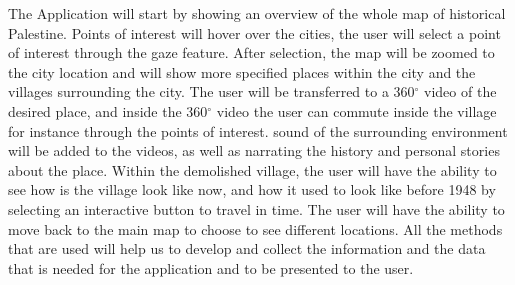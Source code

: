 The Application will start by showing an overview of the whole map of historical Palestine. Points of interest will hover over the cities, the user will select a point of interest through the gaze feature. After selection, the map will be zoomed to the city location and will show more specified places within the city and the villages surrounding the city. The user will be transferred to a 360$^{\circ}$ video of the desired place, and inside the 360$^{\circ}$ video the user can commute inside the village for instance through the points of interest. sound of the surrounding environment will be added to the videos, as well as narrating the history and personal stories about the place. Within the demolished village, the user will have the ability to see how is the village look like now, and how it used to look like before 1948 by selecting an interactive button to travel in time. The user will have the ability to move back to the main map to choose to see different locations. All the methods that are used will help us to develop and collect the information and the data that is needed for the application and to be presented to the user.
